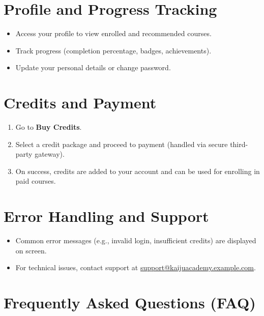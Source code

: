 \documentclass[a4paper,11pt]{scrartcl}
\begin{document}
\section{Profile and Progress Tracking}

\begin{itemize}[leftmargin=*]
    \item Access your profile to view enrolled and recommended courses.
    \item Track progress (completion percentage, badges, achievements).
    \item Update your personal details or change password.
\end{itemize}

\section{Credits and Payment}

\begin{enumerate}[leftmargin=*]
    \item Go to \textbf{Buy Credits}.
    \item Select a credit package and proceed to payment (handled via secure third-party gateway).
    \item On success, credits are added to your account and can be used for enrolling in paid courses.
\end{enumerate}

\section{Error Handling and Support}

\begin{itemize}[leftmargin=*]
    \item Common error messages (e.g., invalid login, insufficient credits) are displayed on screen.
    \item For technical issues, contact support at \href{mailto:support@kaijuacademy.example.com}{support@kaijuacademy.example.com}.
\end{itemize}

\section{Frequently Asked Questions (FAQ)}
\end{document}
